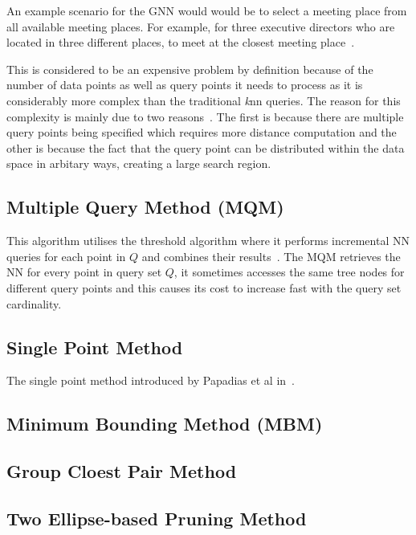 \documentclass[a4paper,11pt]{article}
\begin{document}
An example scenario for the GNN would would be to select a meeting place from all available meeting places. For example, for three executive directors who are located in three different places, to meet at the closest meeting place~\cite{taniar2013taxonomy}.

This is considered to be an expensive problem by definition because of the number of data points as well as query points it needs to process as it is considerably more complex than the traditional \textit{k}nn queries. The reason for this complexity is mainly due to two reasons~\cite{li2005two}. The first is because there are multiple query points being specified which requires more distance computation and the other is because the fact that the query point can be distributed within the data space in arbitary ways, creating a large search region.


\subsection{Multiple Query Method (MQM)}

This algorithm utilises the threshold algorithm where it performs incremental NN queries for each point in $Q$ and combines their results~\cite{papadias2004group}. The MQM retrieves the NN for every point in query set $Q$, it sometimes accesses the same tree nodes for different query points and this causes its cost to increase fast with the query set cardinality.

\subsection{Single Point Method}

The single point method introduced by Papadias et al in~\cite{papadias2004group}. 

\subsection{Minimum Bounding Method (MBM)}

\subsection{Group Cloest Pair Method}

\subsection{Two Ellipse-based Pruning Method}
\end{document}
